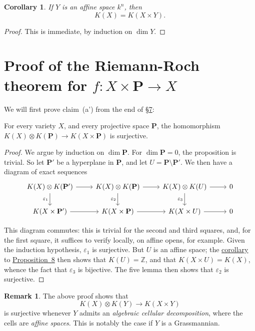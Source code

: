 \documentclass{article}
\theoremstyle{plain}
\newenvironment{proposition}[1]
    {\renewcommand\theinnerproposition{#1}\innerproposition}
    {\endinnerproposition}
\newtheorem*{corollary}{Corollary}
\theoremstyle{definition}
\newtheorem*{remark}{Remark}
\newcommand{\PP}{\mathbf{P}}
\begin{document}
\begin{corollary}
\label{corollary-8}
  If $Y$ is an affine space $k^n$, then
  \[
    K(X) = K(X\times Y).
  \]
\end{corollary}

\begin{proof}
  This is immediate, by induction on $\dim Y$.
\end{proof}


\section{Proof of the Riemann-Roch theorem for \texorpdfstring{$f\colon X\times\mathbf{P}\to X$}{f:XxP->X}}
\label{section9}

We will first prove claim~(a') from the end of \hyperref[section7]{\S7}:

\begin{proposition}{9}
\label{proposition9}
  For every variety $X$, and every projective space $\PP$, the homomorphism $K(X)\otimes K(\PP)\to K(X\times \PP)$ is surjective.
\end{proposition}

\begin{proof}
  We argue by induction on $\dim\PP$.
  For $\dim\PP=0$, the proposition is trivial.
  So let $\PP'$ be a hyperplane in $\PP$, and let $U=\PP\setminus\PP'$.
  We then have a diagram of exact sequences
  \[
    \begin{tikzcd}
      K(X)\otimes K(\PP') \rar \dar[swap,"\varepsilon_1"]
      & K(X)\otimes K(\PP) \rar \dar[swap,"\varepsilon_2"]
      & K(X)\otimes K(U) \rar \dar[swap,"\varepsilon_3"]
      & 0
    \\K(X\times\PP') \rar
      & K(X\times\PP) \rar
      & K(X\times U) \rar
      & 0
    \end{tikzcd}
  \]

  This diagram commutes:
  this is trivial for the second and third squares, and, for the first square, it suffices to verify locally, on affine opens, for example.
  Given the induction hypothesis, $\varepsilon_1$ is surjective.
  But $U$ is an affine space;
  the \hyperref[corollary-8]{corollary} to \hyperref[proposition8]{Proposition~8} then shows that $K(U)=\mathbb{Z}$, and that $K(X\times U)=K(X)$, whence the fact that $\varepsilon_3$ is bijective.
  The five lemma then shows that $\varepsilon_2$ is surjective.
\end{proof}

\begin{remark}
  The above proof shows that
  \[
    K(X)\otimes K(Y) \to K(X\times Y)
  \]
  is surjective whenever $Y$ admits an \emph{algebraic cellular decomposition}, where the cells are \emph{affine spaces}.
  This is notably the case if $Y$ is a Grassmannian.
\end{remark}
\end{document}
